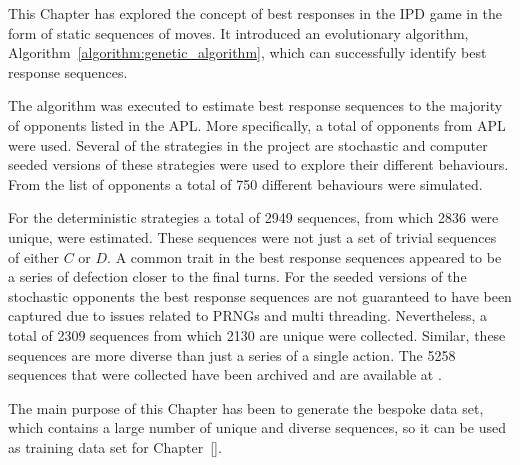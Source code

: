 This Chapter has explored the concept of best responses in the IPD game in the
form of static sequences of moves. It introduced an evolutionary algorithm,
Algorithm~\ref{algorithm:genetic_algorithm}, which can successfully identify
best response sequences.

The algorithm was executed to estimate best response sequences to the majority
of opponents listed in the APL. More specifically, a total of
\numberofstrategiesbestsequences opponents from APL were used. Several of the
strategies in the project are stochastic and computer seeded versions of these
strategies were used to explore their different behaviours. From the list of
\numberofstrategiesbestsequences opponents a total of 750 different behaviours
were simulated.

For the \deterministicstrategies deterministic strategies a total of 2949
sequences, from which 2836 were unique, were estimated. These sequences were not
just a set of trivial sequences of either \(C\) or \(D\). A common trait in the
best response sequences appeared to be a series of defection closer to the final
turns. For the seeded versions of the \stochasticstrategies stochastic opponents
the best response sequences are not guaranteed to have been captured due to issues related to PRNGs and multi threading.
Nevertheless, a total of 2309 sequences from which 2130 are unique were
collected. Similar, these sequences are more diverse than just a series of
a single action. The 5258 sequences that were collected have been
archived and are available at \cite{Glynatsi2020_sequences}.

The main purpose of this Chapter has been to generate the bespoke data set,
which contains a large number of unique and diverse sequences, 
so it can be used as training data set for Chapter~\ref{}. %
